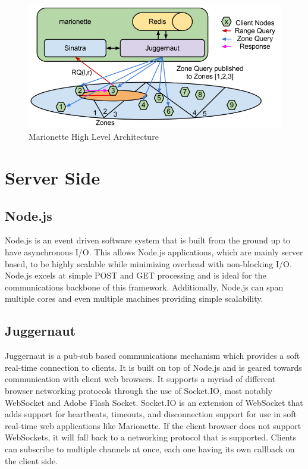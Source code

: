 \documentclass[12pt]{report}	%
\theoremstyle{definition}
\theoremstyle{remark}
\begin{document}
\begin{figure}[h!]
\centering
\includegraphics[scale=0.6]{0.png}
\caption{Marionette High Level Architecture}
\label{hla}
\end{figure}

\section{Server Side}

\subsection{Node.js}

Node.js is an event driven software system that is built from the
ground up to have asynchronous I/O. This allows Node.js applications,
which are mainly server based, to be highly scalable while minimizing
overhead with non-blocking I/O. Node.js excels at simple POST and GET
processing and is ideal for the communications backbone of this
framework. Additionally, Node.js can span multiple cores and even
multiple machines providing simple scalability.

\subsection{Juggernaut}

Juggernaut is a pub-sub based communications mechanism which provides a
soft real-time connection to clients. It is built on top of Node.js and
is geared towards communication with client web browsers. It supports a
myriad of different browser networking protocols through the use of
Socket.IO, most notably WebSocket and Adobe Flash Socket. Socket.IO is
an extension of WebSocket that adds support for heartbeats, timeouts,
and disconnection support for use in soft real-time web applications
like Marionette. If the client browser does not support WebSockets, it
will fall back to a networking protocol that is supported. Clients can
subscribe to multiple channels at once, each one having its own callback
on the client side.
\end{document}

